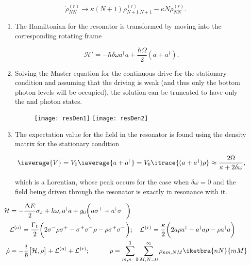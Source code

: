 \begin{equation}\label{ar3}
  \dot{\rho}_{NN}^{(r)} \rightarrow \kappa(N+1)\rho_{N+1\ N+1}^{(r)} - \kappa N \rho_{NN}^{(r)}.
\end{equation}


\begin{enumerate}
\item The Hamiltonian for the resonator is transformed by moving into
  the corresponding rotating frame

  \begin{equation}\label{ar4}
    \mathcal{H'} = -\hbar\delta\omega a^{\dagger}a+\frac{\hbar\Omega}{2}(a+a^{\dagger}).
  \end{equation}

\item Solving  the Master equation  for the continuous drive  for the
  stationary condition  and assuming  that the  driving is  weak (and
  thus only the bottom photon  levels will be occupied), the solution
  can  be truncated  to have  only the   and   photon
  states.

  \begin{figure}[h]
    \texttt{[image: resDen1]}
    \texttt{[image: resDen2]}
  \end{figure}

\item The expectation  value for the field in the  resonator is found
  using the density matrix for the stationary condition

  \begin{equation}\label{filedRes}
    \iaverage{V} = V_0\iaverage{a+a^{\dagger}} = V_0\itrace{(a+a^{\dagger})\rho}\approx\frac{2\Omega}{\kappa+2\delta\omega},
  \end{equation}

  \noindent which is a Lorentian, whose peak occurs for the case when
  $ \delta\omega=0 $ and the field being driven through the resonator
  is exactly in resonance with it.
\end{enumerate}

\noindent {}

\begin{equation}\label{ar1}
  \begin{aligned}
    \mathcal{H} & ={-\frac{\Delta E}{2}\sigma_z}+{{\hbar\omega_r}a^\dagger a} + {g_0\bigg({a\sigma^+}+{a^{\dagger}\sigma^-}\bigg)}\\
    &\mathcal{L}^{(a)} = \frac{\Gamma_1}{2}\bigg(2\sigma^{-}\rho \sigma^{+}-\sigma^{+}\sigma^{-}\rho-\rho \sigma^{+}\sigma^{-}\bigg);\quad\mathcal{L}^{(r)} = \frac{\kappa}{2}\bigg(2a\rho a^{\dagger}-a^{\dagger}a\rho-\rho a^{\dagger}a\bigg)\\
    \dot{\rho} & = -\frac{i}{\hbar}\big[\mathcal{H},\rho\big]+\mathcal{L}^{(a)}+\mathcal{L}^{(r)};\quad\quad\quad \rho = \sum_{m,n=0}^{1}\sum_{M,N=0}^{\infty}\rho_{nm,NM}\iketbra{nN}{mM}\\
  \end{aligned}
\end{equation}

